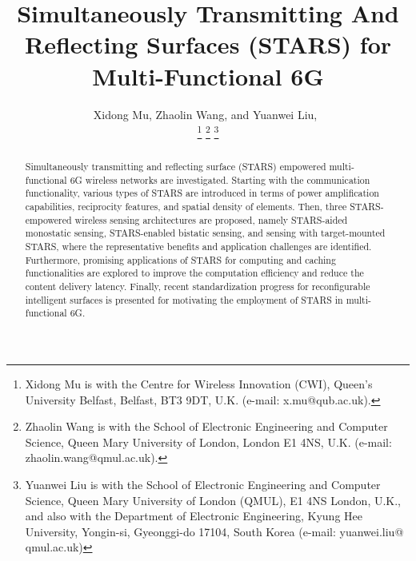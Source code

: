 \documentclass[journal]{IEEEtran}
\theoremstyle{definition}
\begin{document}
\title{Simultaneously Transmitting And Reflecting Surfaces (STARS) for Multi-Functional 6G}



\author{Xidong Mu, Zhaolin Wang, and Yuanwei Liu,~\\

\thanks{Xidong Mu is with the Centre for Wireless Innovation (CWI), Queen's University Belfast, Belfast, BT3 9DT, U.K. (e-mail: x.mu@qub.ac.uk).}
\thanks{Zhaolin Wang is with the School of Electronic Engineering and Computer Science, Queen Mary University of London, London E1 4NS, U.K. (e-mail: zhaolin.wang@qmul.ac.uk).}
\thanks{Yuanwei Liu is with the School of Electronic Engineering and Computer Science, Queen Mary University of London (QMUL), E1 4NS London, U.K., and also with the Department of Electronic Engineering, Kyung Hee University, Yongin-si, Gyeonggi-do 17104, South Korea (e-mail: yuanwei.liu@ qmul.ac.uk)}
}

\maketitle
\begin{abstract}
Simultaneously transmitting and reflecting surface (STARS) empowered multi-functional 6G wireless networks are investigated. Starting with the communication functionality, various types of STARS are introduced in terms of power amplification capabilities, reciprocity features, and spatial density of elements. Then, three STARS-empowered wireless sensing architectures are proposed, namely STARS-aided monostatic sensing, STARS-enabled bistatic sensing, and sensing with target-mounted STARS, where the representative benefits and application challenges are identified. Furthermore, promising applications of STARS for computing and caching functionalities are explored to improve the computation efficiency and reduce the content delivery latency. Finally, recent standardization progress for reconfigurable intelligent surfaces is presented for motivating the employment of STARS in multi-functional 6G.  
\end{abstract}
\end{document}
